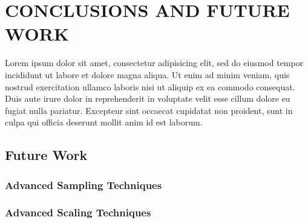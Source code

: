 \chapter{CONCLUSIONS AND FUTURE WORK}
\thispagestyle{plain}

\label{Conclusions}

Lorem ipsum dolor sit amet, consectetur adipisicing elit, sed do eiusmod tempor incididunt ut labore et dolore magna aliqua. Ut enim ad minim veniam, quis nostrud exercitation ullamco laboris nisi ut aliquip ex ea commodo consequat. Duis aute irure dolor in reprehenderit in voluptate velit esse cillum dolore eu fugiat nulla pariatur. Excepteur sint occaecat cupidatat non proident, sunt in culpa qui officia deserunt mollit anim id est laborum.


\section{Future Work}

\subsection{Advanced Sampling Techniques}
\label{sec:fw_sampling}

\subsection{Advanced Scaling Techniques}
\label{sec:fw_scaling}
